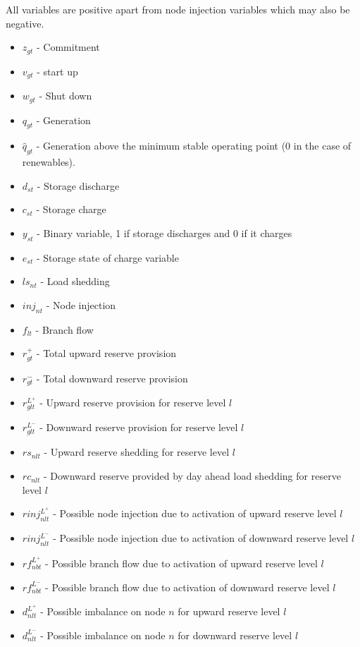 \documentclass[number,times]{elsarticle}
\begin{document}
All variables are positive apart from node injection variables which may also be negative.

\begin{itemize}
    \item $z_{gt}$ - Commitment
    \item $v_{gt}$ - start up
    \item $w_{gt}$ - Shut down
    \item $q_{gt}$ - Generation
    \item $\hat{q}_{gt}$ - Generation above the minimum stable operating point (0 in the case of renewables).
    \item $d_{st}$ - Storage discharge
    \item $c_{st}$ - Storage charge
    \item $y_{st}$ - Binary variable, 1 if storage discharges and 0 if it charges
    \item $e_{st}$ - Storage state of charge variable
    \item $ls_{nt}$ - Load shedding
    \item $inj_{nt}$ - Node injection
    \item $f_{lt}$ - Branch flow
    \item $r^+_{gt}$ - Total upward reserve provision
    \item $r^-_{gt}$ - Total downward reserve provision
    \item $r^{L^+}_{glt}$ - Upward reserve provision for reserve level $l$
    \item $r^{L^-}_{glt}$ - Downward reserve provision for reserve level $l$
    \item $rs_{nlt}$ - Upward reserve shedding for reserve level $l$
    \item $rc_{nlt}$ - Downward reserve provided by day ahead load shedding for reserve level $l$
    \item $rinj_{nlt}^{L^+}$ - Possible node injection due to activation of upward reserve level $l$
    \item $rinj_{nlt}^{L^-}$ - Possible node injection due to activation of downward reserve level $l$
    \item $rf_{nbt}^{L^+}$ - Possible branch flow due to activation of upward reserve level $l$
    \item $rf_{nbt}^{L^-}$ - Possible branch flow due to activation of downward reserve level $l$
    \item $d_{nlt}^{L^+}$ - Possible imbalance on node $n$ for upward reserve level $l$
    \item $d_{nlt}^{L^-}$ - Possible imbalance on node $n$ for downward reserve level $l$
\end{itemize}
\end{document}
